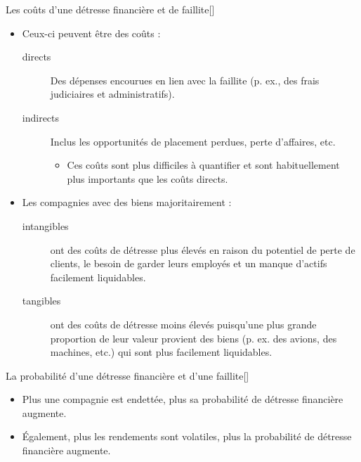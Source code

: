 \documentclass[10pt, french]{article}
\begin{document}
\begin{multicols*}{2}
\begin{definitionGENERAL}{Les coûts d'une détresse financière et de faillite}[]
\begin{itemize}
	\item	Ceux-ci peuvent être des coûts :
		\begin{description}
		\item[directs]	Des dépenses encourues en lien avec la faillite (p. ex., des frais judiciaires et administratifs).
		\item[indirects]	Inclus les opportunités de placement perdues, perte d'affaires, etc.
			\begin{itemize}
			\item	Ces coûts sont plus difficiles à quantifier et sont habituellement plus importants que les coûts directs.
			\end{itemize}
		\end{description}
	\item	Les compagnies avec des biens majoritairement : 
		\begin{description}
		\item[intangibles]	ont des coûts de détresse plus élevés en raison du potentiel de perte de clients, le besoin de garder leurs employés et un manque d'actifs facilement liquidables.
		\item[tangibles]	ont des coûts de détresse moins élevés puisqu'une plus grande proportion de leur valeur provient des biens (p. ex. des avions, des machines, etc.) qui sont plus facilement liquidables.	
	\end{description}
\end{itemize}
\end{definitionGENERAL}

\begin{definitionGENERAL}{La probabilité d'une détresse financière et d'une faillite}[]
\begin{itemize}
	\item	Plus une compagnie est endettée, plus sa probabilité de détresse financière augmente.
	\item	Également, plus les rendements sont volatiles, plus la probabilité de détresse financière augmente.
\end{itemize}
\end{definitionGENERAL}


\end{multicols*}
\end{document}
